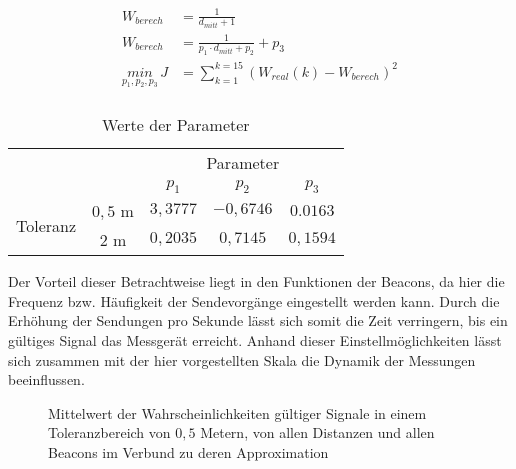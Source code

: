 \begin{align}
W_{berech}&=\frac{1}{d_{mitt}+1} \label{eq:Umkehrfunktion}\\
W_{berech}&=\frac{1}{p_1\cdot d_{mitt}+p_2} + p_3 \label{eq:eUmkehrfunktion}\\
\underset{p_1,p_2,p_3}{min}\, J&=\sum_{k=1}^{k=15}\left ( W_{real}\left ( k \right ) - W_{berech} \right )^{2} \label{eq:OptiUmkehrfunktion} \\
\end{align}
\begin{table}[H]
\begin{center}
\begin{tabular}{|c|c|c|c|c|}
\cline{3-5}
\multicolumn{2}{c|}{} & \multicolumn{3}{c|}{Parameter} \\
\cline{3-5}
\multicolumn{2}{c|}{} & $p_1$ & $p_2$ & $p_3$ \\
\hline
\multirow{2}{*}{Toleranz} & $0,5$ m & $3,3777$ & $-0,6746$ & $0.0163$\\
\cline{2-5}
& $2$ m & $0,2035$ & $0,7145$ & $0,1594$\\
\hline
\end{tabular}
\end{center}
\caption{Werte der Parameter}
\label{tab:ParameterwerteGuete}
\end{table} 
Der Vorteil dieser Betrachtweise liegt in den Funktionen der Beacons, da hier die Frequenz bzw. Häufigkeit der Sendevorgänge eingestellt werden kann. Durch die Erhöhung der Sendungen pro Sekunde lässt sich somit die Zeit verringern, bis ein gültiges Signal das Messgerät erreicht. Anhand dieser Einstellmöglichkeiten lässt sich zusammen mit der hier vorgestellten Skala die Dynamik der Messungen beeinflussen. 
\begin{figure}[H] 
\centering
{}
\caption{Mittelwert der Wahrscheinlichkeiten gültiger Signale in einem Toleranzbereich von $0,5$ Metern, von allen Distanzen und allen Beacons im Verbund zu deren Approximation}
\label{fig:GueteSauelengraph05}
\end{figure} 
